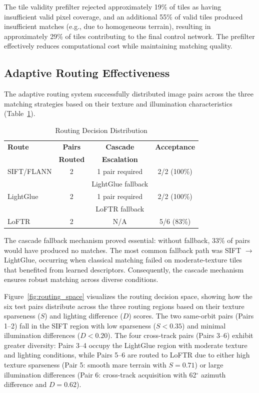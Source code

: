\documentclass[lettersize,journal]{IEEEtran}
\begin{document}
The tile validity prefilter rejected approximately 19\% of tiles as having insufficient valid pixel coverage, and an additional 55\% of valid tiles produced insufficient matches (e.g., due to homogeneous terrain), resulting in approximately 29\% of tiles contributing to the final control network. The prefilter effectively reduces computational cost while maintaining matching quality.

\subsection{Adaptive Routing Effectiveness}

The adaptive routing system successfully distributed image pairs across the three matching strategies based on their texture and illumination characteristics (Table~\ref{tab:routing_dist}).

\begin{table}[htbp]
\caption{Routing Decision Distribution}
\label{tab:routing_dist}
\centering
\begin{tabular}{@{}lccc@{}}
\toprule
\textbf{Route} & \textbf{Pairs} & \textbf{Cascade} & \textbf{Acceptance} \\
 & \textbf{Routed} & \textbf{Escalation} &  \\
\midrule
SIFT/FLANN & 2 & 1 pair required & 2/2 (100\%) \\
 &  & LightGlue fallback &  \\
LightGlue & 2 & 1 pair required & 2/2 (100\%) \\
 &  & LoFTR fallback &  \\
LoFTR & 2 & N/A & 5/6 (83\%) \\
\bottomrule
\end{tabular}
\end{table}

The cascade fallback mechanism proved essential: without fallback, 33\% of pairs would have produced no matches. The most common fallback path was SIFT $\rightarrow$ LightGlue, occurring when classical matching failed on moderate-texture tiles that benefited from learned descriptors. Consequently, the cascade mechanism ensures robust matching across diverse conditions.

Figure~\ref{fig:routing_space} visualizes the routing decision space, showing how the six test pairs distribute across the three routing regions based on their texture sparseness ($S$) and lighting difference ($D$) scores. The two same-orbit pairs (Pairs 1--2) fall in the SIFT region with low sparseness ($S < 0.35$) and minimal illumination differences ($D < 0.20$). The four cross-track pairs (Pairs 3--6) exhibit greater diversity: Pairs 3--4 occupy the LightGlue region with moderate texture and lighting conditions, while Pairs 5--6 are routed to LoFTR due to either high texture sparseness (Pair 5: smooth mare terrain with $S = 0.71$) or large illumination differences (Pair 6: cross-track acquisition with 62$^\circ$ azimuth difference and $D = 0.62$).
\end{document}
